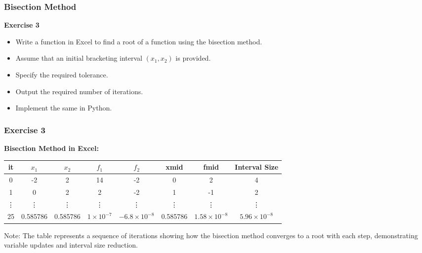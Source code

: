   \begin{frame}[fragile]
    \frametitle{Bisection Method}
  
    \textbf{Exercise 3}
    \begin{itemize}
      \item Write a function in Excel to find a root of a function using the bisection method.
      \item Assume that an initial bracketing interval \((x_1, x_2)\) is provided.
      \item Specify the required tolerance.
      \item Output the required number of iterations.
      \item Implement the same in Python.
    \end{itemize}
  \end{frame}
  
  \begin{frame}[fragile]
    \frametitle{Exercise 3}
    
    \textbf{Bisection Method in Excel:}
    \begin{table}[]
      \begin{tabular}{|c|c|c|c|c|c|c|c|}
      \hline
      it & \(x_1\) & \(x_2\) & \(f_1\) & \(f_2\) & xmid & fmid & Interval Size \\
      \hline
      0 & -2 & 2 & 14 & -2 & 0 & 2 & 4 \\
      1 & 0 & 2 & 2 & -2 & 1 & -1 & 2 \\
      \vdots & \vdots & \vdots & \vdots & \vdots & \vdots & \vdots & \vdots \\
      25 & 0.585786 & 0.585786 & \(1 \times 10^{-7}\) & \(-6.8 \times 10^{-8}\) & 0.585786 & \(1.58 \times 10^{-8}\) & \(5.96 \times 10^{-8}\) \\
      \hline
      \end{tabular}
    \end{table}
    
    Note: The table represents a sequence of iterations showing how the bisection method converges to a root with each step, demonstrating variable updates and interval size reduction. 
  
  \end{frame}
  
